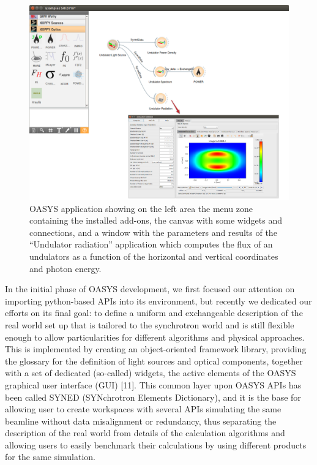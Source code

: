 \documentclass{aip-cp}
\begin{document}
\begin{figure}[h]
\includegraphics[width=14cm]{FIGURES/canvas.png}
\caption{OASYS application showing on the left area the menu zone containing the installed add-ons, the canvas with some widgets and connections, and a window with the parameters and results of the ``Undulator radiation'' application which computes the flux of an undulators as a function of the horizontal and vertical coordinates and photon energy.}
\label{figCanvas}
\end{figure}

In the initial phase of OASYS development, we first focused our attention on importing python-based APIs into its environment, but recently we dedicated our efforts on its final goal: to define a uniform and exchangeable description of the real world set up that is tailored to the synchrotron world and is still flexible enough to allow particularities for different algorithms and physical approaches. This is implemented by creating an object-oriented framework library, providing the glossary for the definition of light sources and optical components, together with a set of dedicated (so-called) widgets, the active elements of the OASYS graphical user interface (GUI) [11]. This common layer upon OASYS APIs has been called SYNED (SYNchrotron Elements Dictionary), and it is the base for allowing user to create workspaces with several APIs simulating the same beamline without data misalignment or redundancy, thus separating the description of the real world from details of the calculation algorithms and allowing users to easily benchmark their calculations by using different products for the same simulation.
\end{document}
